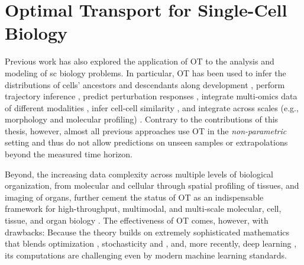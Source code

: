\section{Optimal Transport for Single-Cell Biology}
\label{sec:ot_for_biology}

Previous work has also explored the application of \acrlong{OT} to the analysis and modeling of \acrlong{sc} biology problems.
In particular, \acrshort{OT} has been used to infer the distributions of cells' ancestors and descendants along development \citep{schiebinger2019optimal}, perform trajectory inference \citep{bunne2022proximal, forrow2021lineageot, bunne2022recovering, lavenant2021towards, schiebinger2019optimal, tong2020trajectorynet, yang2020predicting, zhang2021optimal, chizat2022trajectory}, predict perturbation responses \citep{bunne2021learning, yang2018scalable, lubeck2022neural}, integrate multi-omics data of different modalities \citep{demetci2022scot}, infer cell-cell similarity \citep{huizing2022optimal}, and integrate across scales (e.g., morphology and molecular profiling) \citep{yang2021multi}. 
Contrary to the contributions of this thesis, however, almost all previous approaches use \acrshort{OT} in the \emph{non-parametric} setting and thus do not allow predictions on unseen samples or extrapolations beyond the measured time horizon.

Beyond, the increasing data complexity across multiple levels of biological organization, from molecular and cellular through spatial profiling of tissues, and imaging of organs, further cement the status of \acrshort{OT} as an indispensable framework for high-throughput, multimodal, and multi-scale molecular, cell, tissue, and organ biology \citep{moriel2021novosparc}. The effectiveness of \acrshort{OT} comes, however, with drawbacks: Because the theory builds on extremely sophisticated mathematics that blends optimization \citep{cuturi2013sinkhorn, cuturi2022optimal}, stochasticity \citep{chizat2022trajectory, bunne2022recovering} and  \citep{bunne2022proximal}, and, more recently, deep learning \citep{tong2020trajectorynet, bunne2021learning, bunne2022supervised, yang2018scalable, lubeck2022neural, yang2021multi}, its computations are challenging even by modern machine learning standards.

